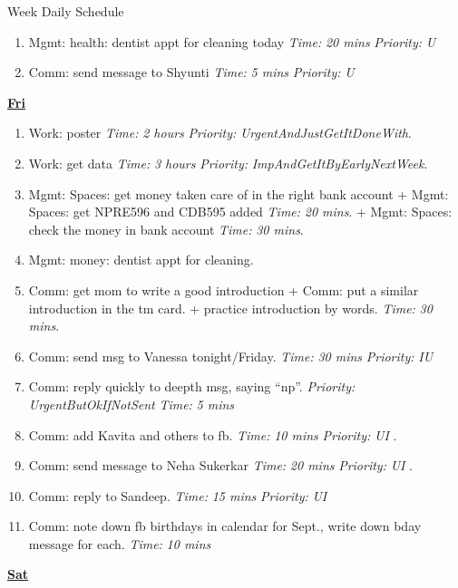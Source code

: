 \documentclass[serif, mathserif, final]{beamer}
\newcommand{\timeEst}[1]{\textit{Time:} \textit{#1}}
\newcommand{\priority}[1]{\textit{Priority:} \textit{#1}}
\begin{document}
\begin{frame}{}
\begin{columns}
\begin{column}{0.50\linewidth}
\begin{block}{Week Daily Schedule}
\begin{enumerate}
\item \tiny Mgmt: health: dentist appt for cleaning today \timeEst{20 mins} \priority{U} 

\item \tiny Comm: send message to Shyunti \timeEst{5 mins} \priority{U} 


\end{enumerate}


\textbf{\small {\underline{Fri}}} 
\begin{enumerate} 

\item \tiny Work: poster \timeEst{2 hours} \priority{UrgentAndJustGetItDoneWith}. 
\item \tiny Work: get data \timeEst{3 hours} \priority{ImpAndGetItByEarlyNextWeek}. 

\item \tiny Mgmt: Spaces: get money taken care of in the right bank account +  Mgmt: Spaces: get NPRE596 and CDB595 added \timeEst{20 mins}.  + Mgmt: Spaces: check the money in bank account \timeEst{30 mins}. 

\item \tiny Mgmt: money: dentist appt for cleaning. 

\item \tiny Comm: get mom to write a good introduction + Comm: put a similar introduction in the tm card. + practice introduction by words. \timeEst{30 mins}. 
\item \tiny Comm: send msg to Vanessa tonight/Friday. \timeEst{30 mins} \priority{IU} 
\item \tiny Comm: reply quickly to deepth msg, saying ``np''. \priority{UrgentButOkIfNotSent} \timeEst{5 mins} 
\item \tiny Comm: add Kavita and others to fb. \timeEst{10 mins} \priority{UI} .
\item \tiny Comm: send message to Neha Sukerkar \timeEst{20 mins} \priority{UI} .
\item \tiny Comm: reply to Sandeep. \timeEst{15 mins} \priority{UI} 
\item \tiny Comm: note down fb birthdays in calendar for Sept., write down bday message for each. \timeEst{10 mins} 
\end{enumerate}

\textbf{\small \underline{Sat}} 
\begin{enumerate} 


\end{enumerate}
\end{block}
\end{column}
\end{columns}
\end{frame}
\end{document}
